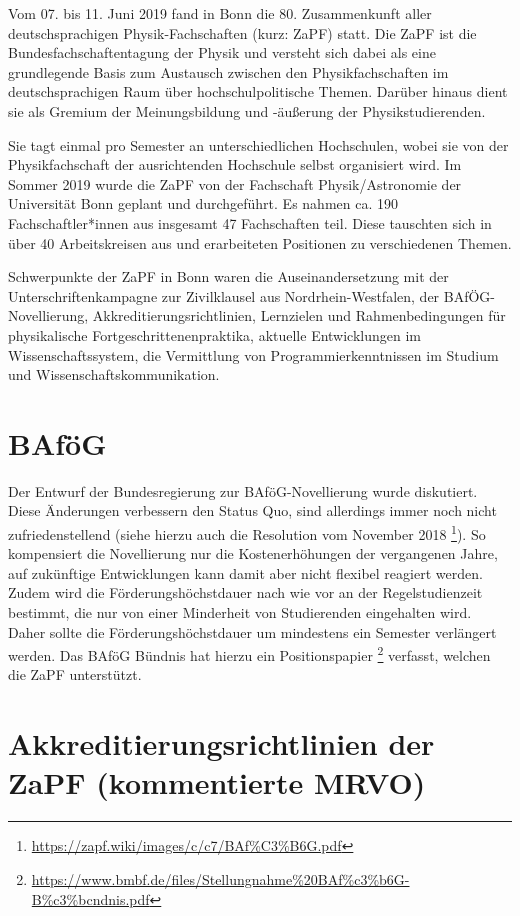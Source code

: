 Vom 07. bis 11. Juni 2019 fand in Bonn die 80. Zusammenkunft aller deutschsprachigen Physik-Fachschaften (kurz: ZaPF) statt.
Die ZaPF ist die Bundesfachschaftentagung der Physik und versteht sich dabei als eine grundlegende Basis zum Austausch zwischen den Physikfachschaften im deutschsprachigen Raum über hochschulpolitische Themen. Darüber hinaus dient sie als Gremium der Meinungsbildung und -äußerung der Physikstudierenden.

Sie tagt einmal pro Semester an unterschiedlichen Hochschulen, wobei sie von der Physikfachschaft der ausrichtenden Hochschule selbst organisiert wird. 
Im Sommer 2019 wurde die ZaPF von der Fachschaft Physik/Astronomie der Universität Bonn geplant und durchgeführt.  
Es nahmen ca. 190 Fachschaftler*innen aus insgesamt 47 Fachschaften teil.
Diese tauschten sich in über 40 Arbeitskreisen aus und erarbeiteten Positionen zu verschiedenen Themen.

Schwerpunkte der ZaPF in Bonn waren die Auseinandersetzung mit der Unterschriftenkampagne zur Zivilklausel aus Nordrhein-Westfalen, 
der BAfÖG-Novellierung, Akkreditierungsrichtlinien, Lernzielen und Rahmenbedingungen für physikalische Fortgeschrittenenpraktika, aktuelle Entwicklungen im Wissenschaftssystem, die Vermittlung von Programmierkenntnissen im Studium und Wissenschaftskommunikation.

\section*{BAföG}

Der Entwurf der Bundesregierung zur BAföG-Novellierung wurde diskutiert.
Diese Änderungen verbessern den Status Quo, sind allerdings immer noch nicht zufriedenstellend (siehe hierzu auch die Resolution vom November 2018 \footnote{\url{https://zapf.wiki/images/c/c7/BAf\%C3\%B6G.pdf}}).
So kompensiert die Novellierung nur die Kostenerhöhungen der vergangenen Jahre, auf zukünftige Entwicklungen kann damit aber nicht flexibel reagiert werden. Zudem wird die Förderungshöchstdauer nach wie vor an der Regelstudienzeit bestimmt, die nur von einer Minderheit von Studierenden eingehalten wird. Daher sollte die Förderungshöchstdauer um mindestens ein Semester verlängert werden.
Das BAföG Bündnis hat hierzu ein Positionspapier \footnote{\url{https://www.bmbf.de/files/Stellungnahme\%20BAf\%c3\%b6G-B\%c3\%bcndnis.pdf}} verfasst, welchen die ZaPF unterstützt.
		
\section*{Akkreditierungsrichtlinien der ZaPF (kommentierte MRVO)}

